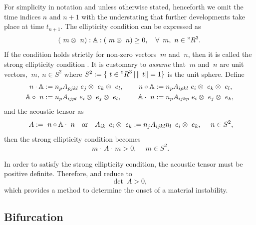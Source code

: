 \documentclass[12pt]{article}
\numberwithin{equation}{section}
\begin{document}
For simplicity in notation and unless otherwise stated, henceforth we
omit the time indices $n$ and $n+1$ with the understating that further
developments take place at time $t_{n+1}$.  The ellipticity condition
can be expressed as
\begin{equation} \label{eq:strong-ellipticity}
  (~m \otimes ~n) : \mathbb{A} : (~m \otimes ~n) \ge 0,
  \quad
  \forall \, ~m, ~n \in {"R}^3.
\end{equation}
If the condition holds strictly for non-zero vectors $~m$ and $~n$,
then it is called the strong ellipticity condition
\citep{Hadamard:1903, Truesdell.Noll:2004, Miehe.etal:2004}. It is
customary to \emph{assume} that $~m$ and $~n$ are unit vectors, \ie
$~m, ~n \in S^2$ where $S^2 := \{ ~t \in {"R}^3 \, | \, \| ~t \| =
1\}$ is the unit sphere. Define
\begin{equation} \label{eq:dot-products}
  \begin{aligned}
    ~n \cdot \mathbb{A} & := n_p A_{pjkl} ~e_j \otimes ~e_k \otimes ~e_l,
    \quad &
    ~n \circ \mathbb{A} & := n_p A_{ipkl} ~e_i \otimes ~e_k \otimes ~e_l,
    \\
    \mathbb{A} \circ ~n & := n_p A_{ijpl} ~e_i \otimes ~e_j \otimes ~e_l,
    \quad &
    \mathbb{A} \cdot ~n & := n_p A_{ijkp} ~e_i \otimes ~e_j \otimes ~e_k,
  \end{aligned}
\end{equation}
and the acoustic tensor as
\begin{equation} \label{eq:acoustic-tensor}
  ~A := ~n \circ \mathbb{A} \cdot ~n
  \quad \text{or} \quad
  A_{ik} \, ~e_i \otimes ~e_k := n_j A_{ijkl} n_l \, ~e_i \otimes ~e_k,
  \quad
  ~n \in S^2,
\end{equation}
then the strong ellipticity condition becomes
\begin{equation} \label{eq:acoustic-ellipticity}
  ~m \cdot ~A \cdot ~m > 0, \quad ~m \in S^2.
\end{equation}

In order to satisfy the strong ellipticity condition, the acoustic
tensor must be positive definite. Therefore,
 and  reduce
to
\begin{equation} \label{eq:acoustic-determinant}
  \det ~A > 0,
\end{equation}
which provides a method to determine the onset of a material
instability.

\subsection{Bifurcation}
\end{document}
